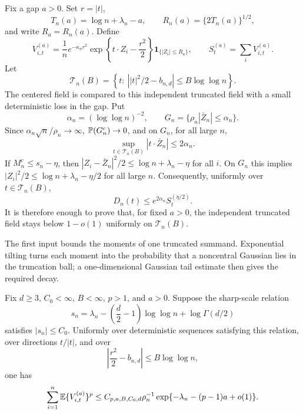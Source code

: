 Fix a gap \(a>0\).  Set \(r=|t|\),
\[
    T_n(a)=\log n+\lambda_n-a,
    \qquad
    R_n(a)=\{2T_n(a)\}^{1/2},
\]
and write \(R_a=R_n(a)\).  Define
\[
    V_{i,t}^{(a)}
    =
    \frac1n
    e^{-\kappa_nr^2}
    \exp\left\{t\cdot Z_i-\frac{r^2}{2}\right\}
    \mathbf 1_{\{|Z_i|\le R_a\}},
    \qquad
    S_t^{(a)}=\sum_iV_{i,t}^{(a)}.
\]
Let
\[
    \mathcal T_n(B)=
    \left\{t:\ \left||t|^2/2-b_{n,d}\right|\le B\log\log n\right\}.
\]
The centered field is compared to this independent truncated field with a
small deterministic loss in the gap.  Put
\[
    \alpha_n=(\log\log n)^{-2},
    \qquad
    G_n=\{\rho_n|\bar Z_n|\le\alpha_n\}.
\]
Since \(\alpha_n\sqrt n/\rho_n\to\infty\), \(\mathbb P(G_n^c)\to0\), and on
\(G_n\), for all large \(n\),
\[
    \sup_{t\in\mathcal T_n(B)}|t\cdot\bar Z_n|\le2\alpha_n .
\]
If \(M_n^c\le s_n-\eta\), then
\(|Z_i-\bar Z_n|^2/2\le\log n+\lambda_n-\eta\) for all \(i\).  On \(G_n\)
this implies \(|Z_i|^2/2\le\log n+\lambda_n-\eta/2\) for all large \(n\).
Consequently, uniformly over \(t\in\mathcal T_n(B)\),
\[
    D_n(t)\le e^{2\alpha_n}S_t^{(\eta/2)} .
\]
It is therefore enough to prove that, for fixed \(a>0\), the independent
truncated field stays below \(1-o(1)\) uniformly on \(\mathcal T_n(B)\).

The first input bounds the moments of one truncated summand. Exponential
tilting turns each moment into the probability that a noncentral Gaussian lies
in the truncation ball; a one-dimensional Gaussian tail estimate then gives
the required decay.
\begin{proposition}
\label{prop:noncentral-ball}
Fix \(d\ge3\), \(C_0<\infty\), \(B<\infty\), \(p>1\), and \(a>0\).  Suppose
the sharp-scale relation
\[
    s_n
    =
    \lambda_n-\left(\frac d2-1\right)\log\log n+\log\Gamma(d/2)
\]
satisfies \(|s_n|\le C_0\).  Uniformly over deterministic sequences satisfying
this relation, over directions \(t/|t|\), and over
\[
    \left|\frac{r^2}{2}-b_{n,d}\right|\le B\log\log n,
\]
one has
\[
    \sum_{i=1}^n\mathbb E \{V_{i,t}^{(a)}\}^p
    \le
    C_{p,a,B,C_0,d}\rho_n^{-1}
    \exp\{-\lambda_n-(p-1)a+o(1)\}.
\]
\end{proposition}


